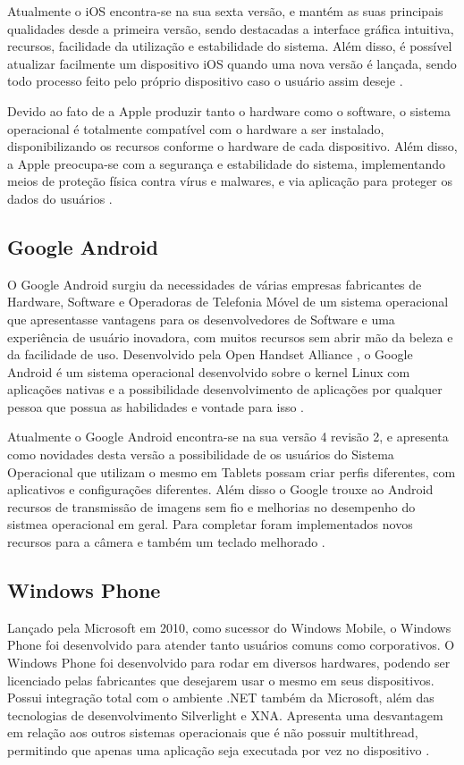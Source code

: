 Atualmente o iOS encontra-se na sua sexta versão, e mantém as suas principais qualidades desde a primeira versão, sendo destacadas a interface gráfica intuitiva, recursos, facilidade da utilização e estabilidade do sistema. Além disso, é possível atualizar facilmente um dispositivo iOS quando uma nova versão é lançada, sendo todo processo feito pelo próprio dispositivo caso o usuário assim deseje \cite{Apple}.

Devido ao fato de a Apple produzir tanto o hardware como o software, o sistema operacional é totalmente compatível com o hardware a ser instalado, disponibilizando os recursos conforme o hardware de cada dispositivo. Além disso, a Apple preocupa-se com a segurança e estabilidade do sistema, implementando meios de proteção física contra vírus e malwares, e via aplicação para proteger os dados do usuários \cite{Apple}.

\subsection{Google Android}
O Google Android surgiu da necessidades de várias empresas fabricantes de Hardware, Software e Operadoras de Telefonia Móvel de um sistema operacional que apresentasse vantagens para os desenvolvedores de Software e uma experiência de usuário inovadora, com muitos recursos sem abrir mão da beleza e da facilidade de uso. Desenvolvido pela Open Handset Alliance \cite{OHA}, o Google Android é um sistema operacional desenvolvido sobre o kernel Linux com aplicações nativas e a possibilidade desenvolvimento de aplicações por qualquer pessoa que possua as habilidades e vontade para isso \cite{lechetagoogle}.

Atualmente o Google Android encontra-se na sua versão 4 revisão 2, e apresenta como novidades desta versão a possibilidade de os usuários do Sistema Operacional que utilizam o mesmo em Tablets possam criar perfis diferentes, com aplicativos e configurações diferentes. Além disso o Google trouxe ao Android recursos de transmissão de imagens sem fio e melhorias no desempenho do sistmea operacional em geral. Para completar foram implementados novos recursos para a câmera e também um teclado melhorado \cite{GoogleAndroid}.

\subsection{Windows Phone}
Lançado pela Microsoft em 2010, como sucessor do Windows Mobile, o Windows Phone foi desenvolvido para atender tanto usuários comuns como corporativos. O Windows Phone foi desenvolvido para rodar em diversos hardwares, podendo ser licenciado pelas fabricantes que desejarem usar o mesmo em seus dispositivos. Possui integração total com o ambiente .NET também da Microsoft, além das tecnologias de desenvolvimento Silverlight e XNA. Apresenta uma desvantagem em relação aos outros sistemas operacionais que é não possuir multithread, permitindo que apenas uma aplicação seja executada por vez no dispositivo \cite{AvaliacaoComparativaSOMoveis}.

